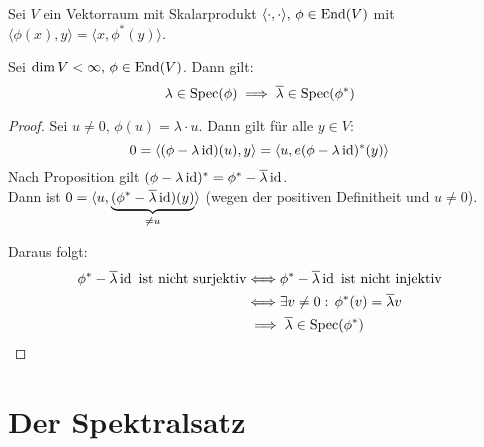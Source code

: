\documentclass[parskip,a4paper,twoside,DIV15,BCOR12mm]{scrbook}
\begin{document}
Sei \(V\) ein Vektorraum mit Skalarprodukt \(\langle\cdot,\cdot\rangle,
\,\phi\in\operatorname{End}(V)\) mit \(\langle\phi(x),y\rangle=
\langle x,\phi^{*}(y)\rangle\).
\begin{lemma}
Sei \(\dim V<\infty,\,\phi\in\operatorname{End}(V)\). Dann gilt:
\[
\lambda\in\operatorname{Spec}(\phi)\implies\overline{\lambda}\in\operatorname{Spec}(\phi^{*})
\]
\end{lemma}
\begin{proof}
Sei \(u\neq0,\,\phi(u)=\lambda\cdot u\). Dann gilt für alle \(y\in V\):
\[
0=\langle(\phi-\lambda\operatorname{id})(u),y\rangle=\langle u,e(\phi-\lambda\operatorname{id})^{*}(y)\rangle
\]
Nach Proposition gilt \((\phi-\lambda\operatorname{id})^{*}=\phi^{*}-\overline{\lambda}\operatorname{id}\).
\\
Dann ist \(0=\langle u,\underbrace{(\phi^{*}-\overline{\lambda}\operatorname{id})(y)}_{\neq u}\rangle\)
(wegen der positiven Definitheit und \(u\neq0\)).

Daraus folgt: 
\begin{align*}
\phi^{*}-\overline{\lambda}\operatorname{id}\text{ ist nicht surjektiv}&\Longleftrightarrow
    \phi^{*}-\overline{\lambda}\operatorname{id}\text{ ist nicht injektiv}\\
&\Longleftrightarrow\exists v\neq0:\,\phi^{*}(v)=\overline{\lambda}v\\
&\implies\overline{\lambda}\in\operatorname{Spec}(\phi^{*})
\end{align*}
\end{proof}

\section{Der Spektralsatz}
\end{document}
